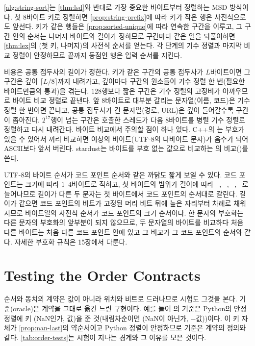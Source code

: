 \cref{alg:string-sort}는 \cref{thm:lsd}와 반대로 가장 중요한 바이트부터 정렬하는 MSD 방식이다. 첫 8바이트 키로 정렬하면 \cref{prop:string-prefix}에 따라 키가 작은 행은 사전식으로도 앞선다. 키가 같은 행들은 \cref{prop:sorted-unique}에 따라 연속한 구간을 이루고, 그 구간 안의 순서는 나머지 바이트와 길이가 정하므로 구간마다 같은 일을 되풀이하면 \cref{thm:lex}의 (첫 키, 나머지)의 사전식 순서를 얻는다. 각 단계의 기수 정렬과 마지막 비교 정렬이 안정하므로 끝까지 동점인 행은 입력 순서를 지킨다.

비용은 공통 접두사의 길이가 정한다. 키가 같은 구간의 공통 접두사가 $L$바이트이면 그 구간은 깊이 $\lceil L/8\rceil$까지 내려가고, 깊이마다 구간의 원소들이 기수 정렬 한 번(필요한 바이트만큼의 통과)을 겪는다. $128$행보다 짧은 구간은 기수 정렬의 고정비가 아까우므로 바이트 비교 정렬로 끝낸다. 앞 8바이트로 대부분 갈리는 문자열(이름, 코드)은 기수 정렬 한 번이면 끝나고, 공통 접두사가 긴 문자열(경로, URL)은 깊이 들어갈수록 구간이 좁아진다. $2^{17}$행이 넘는 구간은 호출한 스레드가 다음 8바이트를 병렬 기수 정렬로 정렬하고 다시 내려간다. 바이트 비교에서 주의할 점이 하나 있다. C++의 는 부호가 있을 수 있어서 끼리 비교하면  이상의 바이트(UTF-8의 다바이트 문자)가 음수가 되어 ASCII보다 앞서 버린다. stardust는 바이트를 부호 없는 값으로 비교하는 의 비교()를 쓴다.

UTF-8의 바이트 순서가 코드 포인트 순서와 같은 까닭도 짧게 보일 수 있다. 코드 포인트는 크기에 따라 $1$--$4$바이트로 적히고, 첫 바이트의 범위가 길이에 따라 --, --, --, --로 늘어나므로 길이가 다른 두 문자는 첫 바이트에서 코드 포인트의 순서대로 갈린다. 길이가 같으면 코드 포인트의 비트가 고정된 머리 비트 뒤에 높은 자리부터 차례로 채워지므로 바이트열의 사전식 순서가 코드 포인트의 크기 순서이다. 한 문자의 부호화는 다른 문자의 부호화의 앞부분이 되지 않으므로, 두 문자열의 바이트를 비교하다 처음 다른 바이트는 처음 다른 코드 포인트 안에 있고 그 비교가 그 코드 포인트의 순서와 같다. 자세한 부호화 규칙은 15장에서 다룬다.



\section{Testing the Order Contracts}
\label{sec:order-testing}

순서와 동치의 계약은 값이 아니라 위치와 비트로 드러나므로 시험도 그것을 본다. 기준(oracle)은 계약을 그대로 옮긴 느린 구현이다. 예를 들어 의 기준은 Python의 안정 정렬에 키 (NaN인가, 값)을 준 것(내림차순이면 (NaN이 아닌가, $-$값))이다. 이 키 자체가 \cref{prop:nan-last}의 약순서이고 Python 정렬이 안정하므로 기준은 계약의 정의와 같다. \cref{tab:order-tests}는 시험이 지나는 경계와 그 이유를 모은 것이다.

